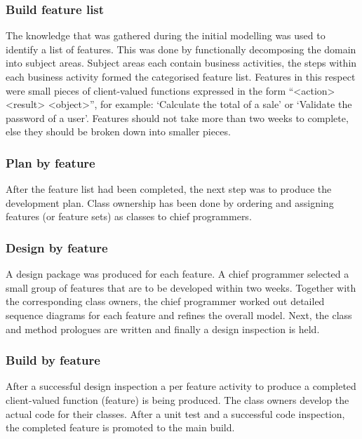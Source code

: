 \subsubsection{Build feature list}

The knowledge that was gathered during the initial modelling was used to identify a list of features. This was done by functionally decomposing the domain into subject areas. Subject areas each contain business activities, the steps within each business activity formed the categorised feature list. Features in this respect were small pieces of client-valued functions expressed in the form ``<action> <result> <object>'', for example: `Calculate the total of a sale' or `Validate the password of a user'. Features should not take more than two weeks to complete, else they should be broken down into smaller pieces.

\subsubsection{Plan by feature}

After the feature list had been completed, the next step was to produce the development plan. Class ownership has been done by ordering and assigning features (or feature sets) as classes to chief programmers.

\subsubsection{Design by feature}

A design package was produced for each feature. A chief programmer selected a small group of features that are to be developed within two weeks. Together with the corresponding class owners, the chief programmer worked out detailed sequence diagrams for each feature and refines the overall model. Next, the class and method prologues are written and finally a design inspection is held.

\subsubsection{Build by feature}

After a successful design inspection a per feature activity to produce a completed client-valued function (feature) is being produced. The class owners develop the actual code for their classes. After a unit test and a successful code inspection, the completed feature is promoted to the main build.

